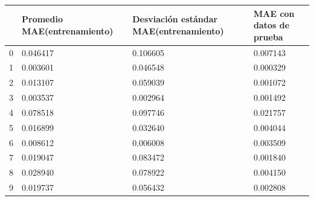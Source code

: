 \begin{tabular}{llll}
\toprule
 & Promedio MAE(entrenamiento) & Desviación estándar MAE(entrenamiento) & MAE con datos de prueba \\
\midrule
0 & 0.046417 & 0.106605 & 0.007143 \\
1 & 0.003601 & 0.046548 & 0.000329 \\
2 & 0.013107 & 0.059039 & 0.001072 \\
3 & 0.003537 & 0.002964 & 0.001492 \\
4 & 0.078518 & 0.097746 & 0.021757 \\
5 & 0.016899 & 0.032640 & 0.004044 \\
6 & 0.008612 & 0.006008 & 0.003509 \\
7 & 0.019047 & 0.083472 & 0.001840 \\
8 & 0.028940 & 0.078922 & 0.004150 \\
9 & 0.019737 & 0.056432 & 0.002808 \\
\bottomrule
\end{tabular}
